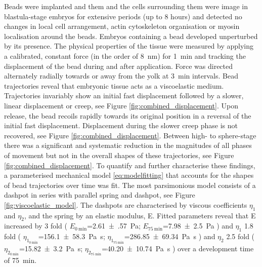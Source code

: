 Beads were implanted and them and the cells surrounding them were image in blastula-stage embryos for extensive periods (up to 8 hours) and detected no changes in local cell arrangement, actin cytoskeleton organisation or myosin localisation around the beads.
Embryos containing a bead developed unperturbed by its presence.
The physical properties of the tissue were measured by applying a calibrated, constant force (in the order of \SI{8}{\nano\metre}) for \SI{1}{\minute} and tracking the displacement of the bead during and after application.
Force was directed alternately radially towards or away from the yolk at \SI{3}{\minute} intervals.
Bead trajectories reveal that embryonic tissue acts as a viscoelastic medium.
Trajectories invariably show an initial fast displacement followed by a slower, linear displacement or creep, see Figure \ref{fig:combined_displacement}.
Upon release, the bead recoils rapidly towards its original position in a reversal of the initial fast displacement.
Displacement during the slower creep phase is not recovered, see Figure \ref{fig:combined_displacement}.
Between high- to sphere-stage there was a significant and systematic reduction in the magnitudes of all phases of movement but not in the overall shapes of these trajectories, see Figure \ref{fig:combined_displacement}.
To quantify and further characterise these findings, a parameterised mechanical model \eqref{eq:modelfitting} that accounts for the shapes of bead trajectories over time was fit.
The most parsimonious model consists of a dashpot in series with parallel spring and dashpot, see Figure \ref{fig:viscoelastic_model}.
The dashpots are characterised by viscous coefficients $\eta_1$ and $\eta_2$, and the spring by an elastic modulus, E.
Fitted parameters reveal that E increased by 3 fold
(
$E_{\SI{0}{\minute}}$=\SI{2.61(57)}{\pascal};
$E_{\SI{75}{\minute}}$=\SI{7.98(250)}{\pascal}
)
and $\eta_1$ 1.8 fold
(
$\eta_{1_{\SI{0}{\minute}}}$=\SI{156.1(583)}{\pascal\second};
$\eta_{1_{\SI{75}{\minute}}}$=\SI{286.85(6934)}{\pascal\second}
)
and $\eta_2$ 2.5 fold
(
$\eta_{2_{\SI{0}{\minute}}}$=\SI{15.82(320)}{\pascal\second};
$\eta_{2_{\SI{75}{\minute}}}$=\SI{40.20(1074)}{\pascal\second}
)
over a development time of \SI{75}{\minute}.
